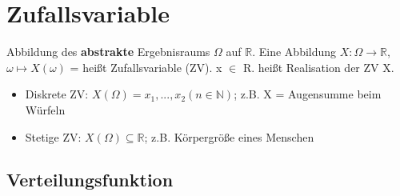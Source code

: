 \section{Zufallsvariable}
Abbildung des \textbf{abstrakte} Ergebnisraums $\Omega$ auf $\mathbb{R}$.
Eine Abbildung $X: \Omega \rightarrow \mathbb{R}$, $\omega \mapsto X(\omega)$ = heißt Zufallsvariable (ZV). x $\in$ R. heißt Realisation der ZV X.
  \begin{itemize}
    \item Diskrete ZV: $X(\Omega) = {x_{1}, ..., x_{2}} (n \in \mathbb{N})$; z.B. X = \dq Augensumme beim Würfeln \dq
    \item Stetige ZV: $X(\Omega) \subseteq \mathbb{R}$; \dq z.B. Körpergröße eines Menschen\dq
  \end{itemize}
\subsection{Verteilungsfunktion}

